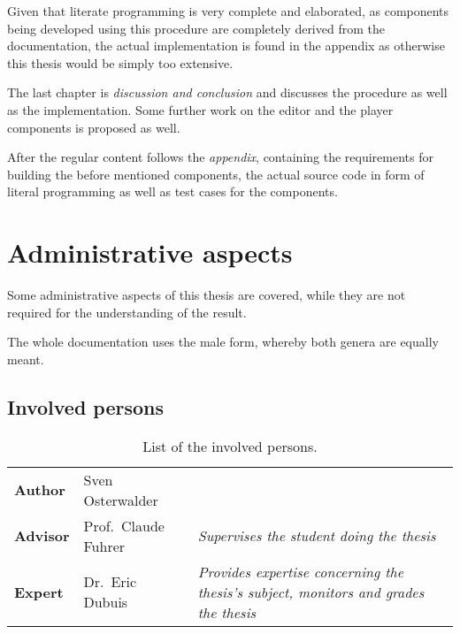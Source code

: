 \documentclass[
    a4paper,      %
    10pt,         %
    openright,    %
    notitlepage,  %
    parskip=half, %
]{scrreprt}       %
\theoremstyle{definition}                    %
\begin{document}
Given that literate programming is very complete and elaborated, as components
being developed using this procedure are completely derived from the
documentation, the actual implementation is found in the appendix as otherwise
this thesis would be simply too extensive.

The last chapter is \textit{discussion and conclusion} and discusses the
procedure as well as the implementation. Some further work on the editor and the
player components is proposed as well.

After the regular content follows the \textit{appendix}, containing the
requirements for building the before mentioned components, the actual source
code in form of literal programming as well as test cases for the components.%

\chapter{Administrative aspects}
\label{chap:administrative_aspects}

Some administrative aspects of this thesis are covered, while they are not
required for the understanding of the result.

The whole documentation uses the male form, whereby both genera are equally
meant.

\section{Involved persons}
\label{sec:involved_persons}

\begin{table}[h]
  \begin{tabularx}{\textwidth}{|l|l|X|}
    \textbf{Author}  & Sven Osterwalder\protect\footnotemark[1]{}     & \\
    \textbf{Advisor} & Prof.\ Claude Fuhrer\protect\footnotemark[2]{} & \textit{Supervises the student doing the thesis}\\
    \textbf{Expert}  & Dr.\ Eric Dubuis\protect\footnotemark[3]{}     & \textit{Provides expertise concerning the thesis's subject, monitors and grades the thesis}\\
  \end{tabularx}
  \caption{List of the involved persons.}
\end{table}
\end{document}
